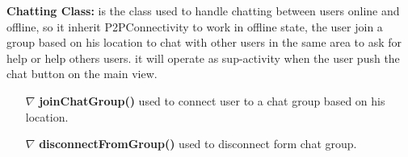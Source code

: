 \documentclass{scrreprt}
\begin{document}

\textbf{Chatting Class:} is the class used to handle chatting between users online and offline, so it inherit P2PConnectivity to work in offline state, the user join a group based on his location to chat with other users in the same area to ask for help or help others users. it will operate as sup-activity when the user push the chat button on the main view.


\begin{itemize}
\item[$\nabla$]  \textbf{joinChatGroup()} used to connect user to a chat group based on his location.
\item[$\nabla$] \textbf{disconnectFromGroup()} used to disconnect form chat group.
\end{itemize}


\clearpage
\end{document}

